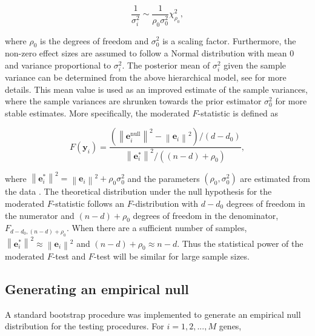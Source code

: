 \documentclass[11pt]{article}
\begin{document}
\begin{equation}
\frac{1}{\sigma_{i}^{2}} \sim \frac{1}{\rho_{0}\sigma_{0}^{2}} \chi_{\rho_{0}}^{2},
\end{equation}

\noindent where $\rho_{0}$ is the degrees of freedom and $\sigma_{0}^{2}$ is a scaling factor. Furthermore, the non-zero effect sizes are assumed to follow a Normal distribution with mean 0 and variance proportional to $\sigma_{i}^{2}$. The posterior mean of $\sigma_{i}^{2}$ given the sample variance can be determined from the above hierarchical model, see \cite{smyth2004linear} for more details. This mean value is used as an improved estimate of the sample variances, where the sample variances are shrunken towards the prior estimator $\sigma_{0}^{2}$ for more stable estimates. More specifically, the moderated $F$-statistic is defined as

\begin{equation}
F(\mathbf{y}_{i}) = \dfrac{\left(\left\lVert \mathbf{e}^{\text{null}}_{i}\right\rVert ^{2}-\left\lVert \mathbf{e}_{i} \right\rVert ^ {2} \right)/(d-d_{0})}{\left\lVert \mathbf{e}_{i}^{*} \right\rVert ^ {2}/((n-d) + \rho_{0})},
\end{equation}

\noindent where $\left\lVert\mathbf{e}^{*}_{i}\right\rVert ^ {2} = \left\lVert \mathbf{e}_{i} \right\rVert ^ {2} + \rho_{0}\sigma_{0}^{2}$ and the parameters $(\rho_{0}, \sigma_{0}^{2})$ are estimated from the data \citep{smyth2004linear}. The theoretical distribution under the null hypothesis for the moderated $F$-statistic follows an $F$-distribution with $d-d_{0}$ degrees of freedom in the numerator and $(n-d) + \rho_{0}$ degrees of freedom in the denominator, $F_{d-d_{0},(n-d)+\rho_{0}}$. When there are a sufficient number of samples, $\left\lVert\mathbf{e}^{*}_{i}\right\rVert ^ {2} \approx \left\lVert \mathbf{e}_{i} \right\rVert ^ {2}$ and $(n-d) + \rho_{0} \approx n-d$. Thus the statistical power of the moderated $F$-test and $F$-test will be similar for large sample sizes.

\subsection{Generating an empirical null\label{Subsec:null}}

A standard bootstrap procedure was implemented to generate an empirical null distribution for the testing procedures. For $i = 1,2,..., M$ genes,
\end{document}
